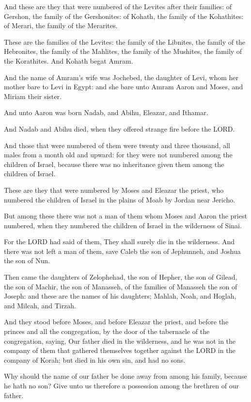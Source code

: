 \Verse And these are they that were numbered of the Levites after their
families: of Gershon, the family of the Gershonites: of Kohath, the
family of the Kohathites: of Merari, the family of the Merarites.

\Verse These are the families of the Levites: the family of the
Libnites, the family of the Hebronites, the family of the Mahlites,
the family of the Mushites, the family of the Korathites. And Kohath
begat Amram.

\Verse And the name of Amram's wife was Jochebed, the daughter of Levi,
whom her mother bare to Levi in Egypt: and she bare unto Amram Aaron
and Moses, and Miriam their sister.

\Verse And unto Aaron was born Nadab, and Abihu, Eleazar, and Ithamar.

\Verse And Nadab and Abihu died, when they offered strange fire before
the LORD.

\Verse And those that were numbered of them were twenty and three
thousand, all males from a month old and upward: for they were not
numbered among the children of Israel, because there was no
inheritance given them among the children of Israel.

\Verse These are they that were numbered by Moses and Eleazar the
priest, who numbered the children of Israel in the plains of Moab by
Jordan near Jericho.

\Verse But among these there was not a man of them whom Moses and Aaron
the priest numbered, when they numbered the children of Israel in the
wilderness of Sinai.

\Verse For the LORD had said of them, They shall surely die in the
wilderness. And there was not left a man of them, save Caleb the son
of Jephunneh, and Joshua the son of Nun.


\Chapter
\Verse Then came the daughters of Zelophehad, the son of Hepher, the son
of Gilead, the son of Machir, the son of Manasseh, of the families of
Manasseh the son of Joseph: and these are the names of his daughters;
Mahlah, Noah, and Hoglah, and Milcah, and Tirzah.

\Verse And they stood before Moses, and before Eleazar the priest, and
before the princes and all the congregation, by the door of the
tabernacle of the congregation, saying, \Verse Our father died in the
wilderness, and he was not in the company of them that gathered
themselves together against the LORD in the company of Korah; but died
in his own sin, and had no sons.

\Verse Why should the name of our father be done away from among his
family, because he hath no son? Give unto us therefore a possession
among the brethren of our father.


